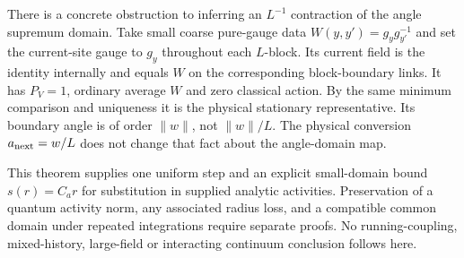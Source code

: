 \documentclass[11pt]{article}
\theoremstyle{remark}\newtheorem{remark}[theorem]{Remark}
\begin{document}
There is a concrete obstruction to inferring an $L^{-1}$ contraction
of the angle supremum domain. Take small coarse pure-gauge data
$W(y,y')=g_yg_{y'}^{-1}$ and set the current-site gauge to $g_y$
throughout each $L$-block. Its current field is the identity internally
and equals $W$ on the corresponding block-boundary links. It has
$P_V=1$, ordinary average $W$ and zero classical action. By the same
minimum comparison and uniqueness it is the physical stationary
representative. Its boundary angle is of order $\|w\|$, not
$\|w\|/L$. The physical conversion $a_{\rm next}=w/L$ does not change
that fact about the angle-domain map.

This theorem supplies one uniform step and an explicit small-domain
bound $s(r)=C_ar$ for substitution in supplied analytic activities.
Preservation of a quantum activity norm, any associated radius loss,
and a compatible common domain under repeated integrations require
separate proofs. No running-coupling, mixed-history, large-field or
interacting continuum conclusion follows here.
\end{document}
